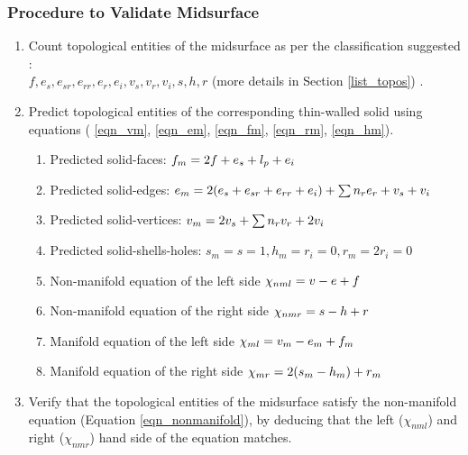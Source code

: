 \subsubsection{Procedure to Validate Midsurface}
\begin{enumerate}
\item Count topological entities of the midsurface as per the classification suggested : \\$f, e_s , e_{sr} , e_{rr}, e_r , e_i, v_s , v_r , v_i, s , h , r$ (more details in Section \ref{list_topos}) .
\item Predict topological entities of the corresponding thin-walled solid using equations ( \ref{eqn_vm}, \ref{eqn_em}, \ref{eqn_fm}, \ref{eqn_rm}, \ref{eqn_hm}).
	\begin{enumerate}
		\item Predicted solid-faces: $f_m \newline = 2f+e_s+ l_p +e_i $
		\item Predicted solid-edges: $e_m \newline = 2(e_s+e_{sr}+e_{rr}+e_i )+ \sum n_{r} e_{r}+v_s+v_i $
		\item Predicted solid-vertices: $v_m \newline= 2v_s+ \sum n_{r} v_r+2v_i$
		\item Predicted solid-shells-holes: \newline$s_m =s = 1, h_m = r_i  = 0, r_m = 2r_i = 0$
		\item Non-manifold equation of the left side  $\chi_{nml} \newline= v-e+f $
		\item Non-manifold equation of the  right side  $\chi_{nmr} \newline=s-h+r$
		\item Manifold equation of the  left side  $\chi_{ml} \newline= v_m-e_m+f_m $
		\item Manifold equation of the  right side  $\chi_{mr}\newline=2(s_m-h_m )+r_m$
	\end{enumerate}
\item Verify that the topological entities of the midsurface satisfy the non-manifold equation (Equation \ref{eqn_nonmanifold}), by deducing that the left ($\chi_{nml}$) and right  ($\chi_{nmr}$) hand side of the equation matches.

\end{enumerate}
